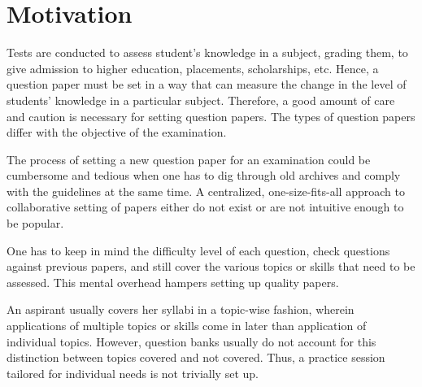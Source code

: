 \documentclass[13pt]{article}
\begin{document}
\newpage
\section{Motivation}
Tests are conducted to assess student's knowledge in a subject, grading them, to give admission to higher education, placements, scholarships, etc. Hence, a question paper must be set in a way that can measure the change in the level of students' knowledge in a particular subject. Therefore, a good amount of care and caution is necessary for setting question papers. The types of question papers differ with the objective of the examination.\par

The process of setting a new question paper for an examination could be cumbersome and tedious when one has to dig through old archives and comply with the guidelines at the same time. A centralized, one-size-fits-all approach to collaborative setting of papers either do not exist or are not intuitive enough to be popular.\par

One has to keep in mind the difficulty level of each question, check questions against previous papers, and still cover the various topics or skills that need to be assessed. This mental overhead hampers setting up quality papers.\par

An aspirant usually covers her syllabi in a topic-wise fashion, wherein applications of multiple topics or skills come in later than application of individual topics. However, question banks usually do not account for this distinction between topics covered and not covered. Thus, a practice session tailored for individual needs is not trivially set up.\par
\end{document}

